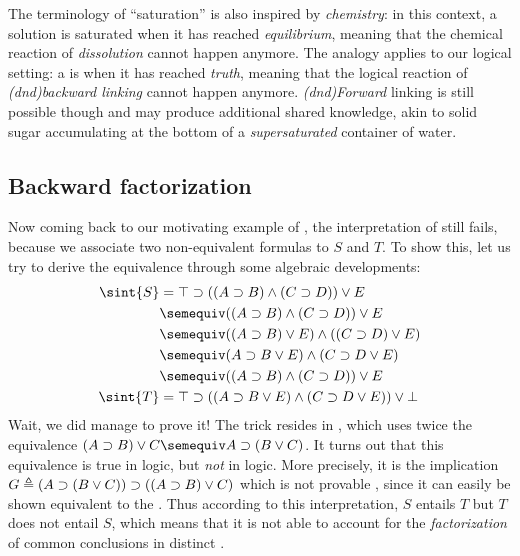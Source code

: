 \begin{scope}
\begin{remark}
  The terminology of ``saturation'' is also inspired by \emph{chemistry}: in
  this context, a solution is saturated when it has reached \emph{equilibrium},
  meaning that the chemical reaction of \emph{dissolution} cannot happen
  anymore. The analogy applies to our logical setting: a  is
   when it has reached \emph{truth}, meaning that the logical
  reaction of \emph{\kl(dnd){backward} linking} cannot happen anymore.
  \emph{\kl(dnd){Forward}} linking is still possible though and may produce
  additional shared knowledge, akin to solid sugar accumulating at the bottom of
  a \emph{supersaturated} container of water.
\end{remark}

\subsection{Backward factorization}

Now coming back to our motivating example of , the
interpretation of  still fails, because we associate two
non-equivalent formulas to $S$ and $T$. To show this, let us try to derive the
equivalence through some algebraic developments:
\begin{align}
  \sint{S} &= \top \limp ((A \limp B) \land (C \limp D)) \lor E \nonumber\\
              &\semequiv ((A \limp B) \land (C \limp D)) \lor E \nonumber\\
              &\semequiv ((A \limp B) \lor E) \land ((C \limp D) \lor E) \nonumber\\
              &\semequiv (A \limp B \lor E) \land (C \limp D \lor E) \labeq{grishin}\\
              &\semequiv ((A \limp B) \land (C \limp D)) \lor E \nonumber\\
  \sint{T} &= \top \limp ((A \limp B \lor E) \land (C \limp D \lor E)) \lor \bot \nonumber
\end{align}
Wait, we did manage to prove it! The trick resides in , which
uses twice the equivalence $(A \limp B) \lor C \semequiv A \limp (B \lor C)$. It
turns out that this equivalence is true in  logic, but \emph{not}
in  logic. More precisely, it is the implication $G \triangleq (A
\supset (B \lor C)) \supset ((A \supset B) \lor C)$ which is not provable
, since it can easily be shown equivalent to the . Thus according to this
interpretation, $S$ entails $T$ but $T$ does not entail $S$, which means that it
is not able to account for the \emph{factorization} of common conclusions in
distinct .


\end{scope}
